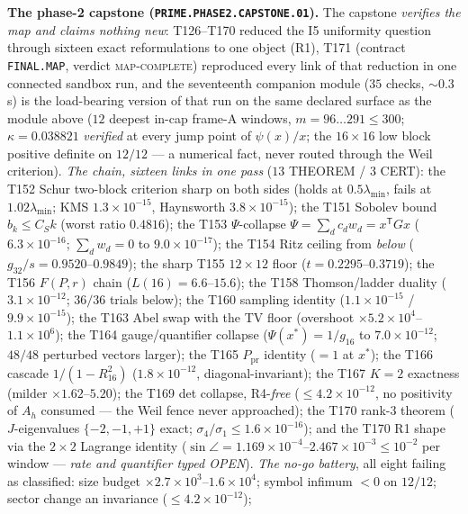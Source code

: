 \documentclass[11pt,a4paper]{article}
\theoremstyle{definition}
\begin{document}
\par\smallskip\noindent\textbf{The phase-2 capstone
(\texttt{PRIME.PHASE2.CAPSTONE.01}).}
The capstone \emph{verifies the map and claims nothing new}: T126--T170
reduced the I5 uniformity question through sixteen exact reformulations
to one object (R1), T171 (contract \texttt{FINAL.MAP}, verdict
\textsc{map-complete}) reproduced every link of that reduction in one
connected sandbox run, and the seventeenth companion module ($35$
checks, ${\sim}0.3$\,s) is the load-bearing version of that run on the
same declared surface as the module above ($12$ deepest in-cap frame-A
windows, $m=96\ldots291\le300$; $\kappa=0.038821$ \emph{verified} at
every jump point of $\psi(x)/x$; the $16\times16$ low block positive
definite on $12/12$ --- a numerical fact, never routed through the Weil
criterion).
\emph{The chain, sixteen links in one pass} ($13$ THEOREM / $3$ CERT):
the T152 Schur two-block criterion sharp on both sides (holds at
$0.5\lambda_{\min}$, fails at $1.02\lambda_{\min}$; KMS
$1.3\times10^{-15}$, Haynsworth $3.8\times10^{-15}$); the T151 Sobolev
bound $b_k\le C_Sk$ (worst ratio $0.4816$); the T153 $\Psi$-collapse
$\Psi=\sum_dc_dw_d=x^{\mathsf T}Gx$ ($6.3\times10^{-16}$; $\sum_dw_d=0$
to $9.0\times10^{-17}$); the T154 Ritz ceiling from \emph{below}
($g_{32}/s=0.9520$--$0.9849$); the sharp T155 $12\times12$ floor
($t=0.2295$--$0.3719$); the T156 $F(P,r)$ chain ($L(16)=6.6$--$15.6$);
the T158 Thomson/ladder duality ($3.1\times10^{-12}$; $36/36$ trials
below); the T160 sampling identity ($1.1\times10^{-15}$ /
$9.9\times10^{-15}$); the T163 Abel swap with the TV floor (overshoot
$\times5.2\times10^{4}$--$1.1\times10^{6}$); the T164 gauge/quantifier
collapse ($\Psi(x^*)=1/g_{16}$ to $7.0\times10^{-12}$; $48/48$
perturbed vectors larger); the T165 $P_{\mathrm{pr}}$ identity
($=1$ at $x^*$); the T166 cascade $1/(1-R_{16}^2)$
($1.8\times10^{-12}$, diagonal-invariant); the T167 $K=2$ exactness
(milder $\times1.62$--$5.20$); the T169 det collapse, R4-\emph{free}
($\le4.2\times10^{-12}$, no positivity of $A_h$ consumed --- the Weil
fence never approached); the T170 rank-3 theorem ($J$-eigenvalues
$\{-2,-1,+1\}$ exact; $\sigma_4/\sigma_1\le1.6\times10^{-16}$); and the
T170 R1 shape via the $2\times2$ Lagrange identity ($\sin\angle=
1.169\times10^{-4}$--$2.467\times10^{-3}\le10^{-2}$ per window ---
\emph{rate and quantifier typed OPEN}).
\emph{The no-go battery}, all eight failing as classified: size budget
$\times2.7\times10^{3}$--$1.6\times10^{4}$; symbol infimum $<0$ on
$12/12$; sector change an invariance ($\le4.2\times10^{-12}$);
\end{document}
